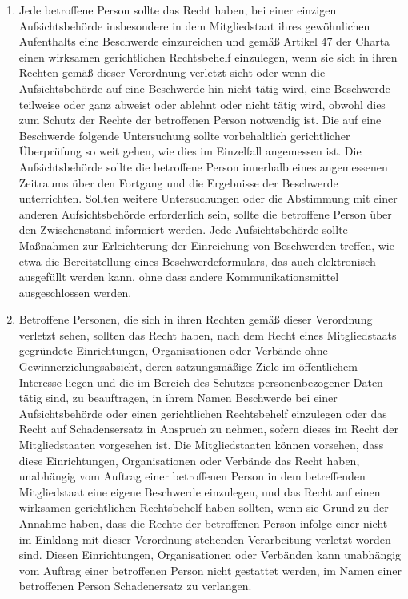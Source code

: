 \begin{enumerate}
   \item Jede betroffene Person sollte das Recht haben, bei einer einzigen Aufsichtsbehörde insbesondere in dem
    Mitgliedstaat ihres gewöhnlichen Aufenthalts eine Beschwerde einzureichen und gemäß Artikel 47 der Charta einen
    wirksamen gerichtlichen Rechtsbehelf einzulegen, wenn sie sich in ihren Rechten gemäß dieser Verordnung verletzt
    sieht oder wenn die Aufsichtsbehörde auf eine Beschwerde hin nicht tätig wird, eine Beschwerde teilweise oder ganz
    abweist oder ablehnt oder nicht tätig wird, obwohl dies zum Schutz der Rechte der betroffenen Person notwendig ist.
    Die auf eine Beschwerde folgende Untersuchung sollte vorbehaltlich gerichtlicher Überprüfung so weit gehen, wie
    dies im Einzelfall angemessen ist. Die Aufsichtsbehörde sollte die betroffene Person innerhalb eines angemessenen
    Zeitraums über den Fortgang und die Ergebnisse der Beschwerde unterrichten. Sollten weitere Untersuchungen oder die
    Abstimmung mit einer anderen Aufsichtsbehörde erforderlich sein, sollte die betroffene Person über den
    Zwischenstand informiert werden. Jede Aufsichtsbehörde sollte Maßnahmen zur Erleichterung der Einreichung von
    Beschwerden treffen, wie etwa die Bereitstellung eines Beschwerdeformulars, das auch elektronisch ausgefüllt werden
    kann, ohne dass andere Kommunikationsmittel ausgeschlossen werden.%
   \label{itm:eg-141}
   

   \item Betroffene Personen, die sich in ihren Rechten gemäß dieser Verordnung verletzt sehen, sollten das Recht haben,
    nach dem Recht eines Mitgliedstaats gegründete Einrichtungen, Organisationen oder Verbände ohne
    Gewinnerzielungsabsicht, deren satzungsmäßige Ziele im öffentlichem Interesse liegen und die im Bereich des
    Schutzes personenbezogener Daten tätig sind, zu beauftragen, in ihrem Namen Beschwerde bei einer Aufsichtsbehörde
    oder einen gerichtlichen Rechtsbehelf einzulegen oder das Recht auf Schadensersatz in Anspruch zu nehmen, sofern
    dieses im Recht der Mitgliedstaaten vorgesehen ist. Die Mitgliedstaaten können vorsehen, dass diese Einrichtungen,
    Organisationen oder Verbände das Recht haben, unabhängig vom Auftrag einer betroffenen Person in dem betreffenden
    Mitgliedstaat eine eigene Beschwerde einzulegen, und das Recht auf einen wirksamen gerichtlichen Rechtsbehelf haben
    sollten, wenn sie Grund zu der Annahme haben, dass die Rechte der betroffenen Person infolge einer nicht im
    Einklang mit dieser Verordnung stehenden Verarbeitung verletzt worden sind. Diesen Einrichtungen, Organisationen
    oder Verbänden kann unabhängig vom Auftrag einer betroffenen Person nicht gestattet werden, im Namen einer
    betroffenen Person Schadenersatz zu verlangen.%
   \label{itm:eg-142}
   

\end{enumerate}
